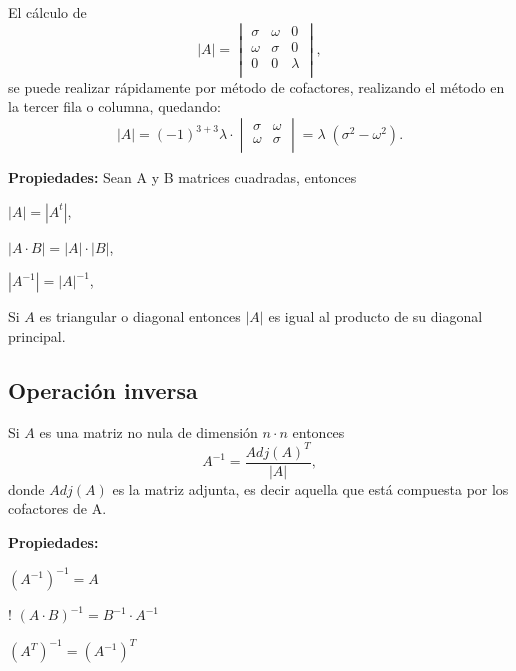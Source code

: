 \begin{example}
    El cálculo de
    \begin{equation*}
        |A| = 
        \begin{vmatrix}
            \sigma & \omega & 0 \\
            \omega & \sigma & 0 \\
            0 & 0 & \lambda \\
        \end{vmatrix},
    \end{equation*}
    se puede realizar rápidamente por método de cofactores, realizando el método en la tercer fila o columna, quedando:
    \begin{equation*}
        |A| = (-1)^{3+3}\lambda \cdot \begin{vmatrix}
            \sigma & \omega \\
            \omega & \sigma \\
        \end{vmatrix} = \lambda \; (\sigma^2 - \omega^2).
    \end{equation*}
\end{example}

\textbf{Propiedades:} Sean A y B matrices cuadradas, entonces

\begin{bangenumerate}
    \item $|A| = |A^t|$,
    \item $|A \cdot B| = |A|\cdot |B|$,
    \item $|A^{-1}| = |A|^{-1}$,
    \item Si $A$ es triangular o diagonal entonces $|A|$ es igual al producto de
    su diagonal principal.
\end{bangenumerate}

\subsection{Operación inversa}
\begin{definition}
    Si $A$ es una matriz no nula de dimensión $n \cdot n$ entonces
    \begin{equation*}
        A^{-1}  = \frac{Adj(A)^{T}}{|A|},
    \end{equation*}
    donde $Adj(A)$ es la matriz adjunta, es decir aquella que está compuesta por los cofactores de A.
\end{definition}

\textbf{Propiedades:}
\begin{bangenumerate}
    \item $(A^{-1})^{-1} = A$
    \item! $(A\cdot B)^{-1} = B^{-1}\cdot A^{-1}$
    \item $(A^T)^{-1} = (A^{-1})^T$
\end{bangenumerate}

